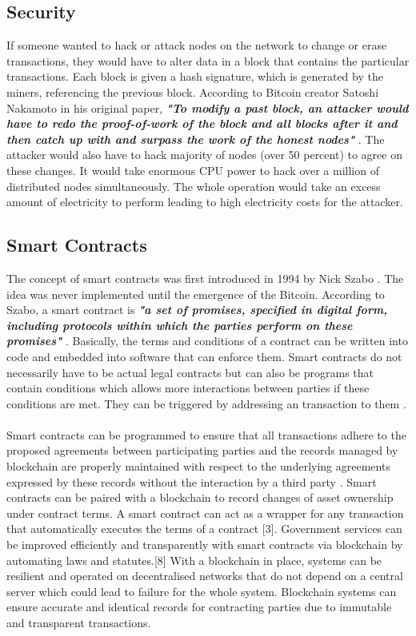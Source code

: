 \documentclass[report]{IEEEtran}
\begin{document}
 \subsection{Security}
 If someone wanted to hack or attack nodes on the network to change or erase transactions, they would have to alter data in a block that contains the particular transactions. Each block is given a hash signature, which is generated by the miners, referencing the previous block. According to Bitcoin creator Satoshi Nakamoto in his original paper, \textbf{\textit{"To modify a past block, an attacker would have to redo the proof-of-work of the block and all blocks after it and then catch up with and surpass the work of the honest nodes"}} \cite{bitcoin}. The attacker would also have to hack majority of nodes (over 50 percent) to agree on these changes. It would take enormous CPU power to hack over a million of distributed nodes simultaneously. The whole operation would take an excess amount of electricity to perform leading to high electricity costs for the attacker.
 
 \subsection{Smart Contracts}
 The concept of smart contracts was first introduced in 1994 by Nick Szabo \cite{szabo}. The idea was never implemented until the emergence of the Bitcoin. According to Szabo, a smart contract is \textbf{\textit{"a set of promises, specified in digital form, including protocols within which the parties perform on these promises"}} \cite{szabo}. Basically, the terms and conditions of a contract can be written into code and embedded into software that can enforce them. Smart contracts do not necessarily have to be actual legal contracts but can also be programs that contain conditions which allows more interactions between parties if these conditions are met. They can be triggered by addressing an transaction to them \cite{blockchain&smartcontracts}.
 \\\\ Smart contracts can be programmed to ensure that all transactions adhere to the proposed agreements between participating parties and the records managed by blockchain are properly maintained with respect to the underlying agreements expressed by these records without the interaction by a third party \cite{double}. Smart contracts can be paired with a blockchain to record changes of asset ownership under contract terms. A smart contract can act as a wrapper for any transaction that automatically executes the terms of a contract [3]. Government services can be improved efficiently and transparently with smart contracts via blockchain by automating laws and statutes.[8] With a blockchain in place, systems can be resilient and operated on decentralised networks that do not depend on a central server which could lead to failure for the whole system. Blockchain systems can ensure accurate and identical records for contracting parties due to immutable and transparent transactions. 
\end{document}
